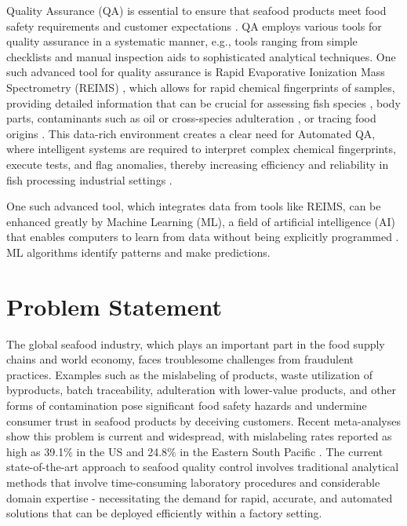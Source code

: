 Quality Assurance (QA) is essential to ensure that seafood products meet food safety requirements and customer expectations \citep{Montgomery2019}. QA employs various tools for quality assurance in a systematic manner, e.g., tools ranging from simple checklists and manual inspection aids to sophisticated analytical techniques. One such advanced tool for quality assurance is Rapid Evaporative Ionization Mass Spectrometry (REIMS) \citep{Schaefer2009, Cafarella2024}, which allows for rapid chemical fingerprints of samples, providing detailed information that can be crucial for assessing fish species \citep{Black2017, Shen2020, Shen2022}, body parts, contaminants such as oil or cross-species adulteration \citep{Premanandh2013}, or tracing food origins \citep{Lu2024, Gao2025, Gkarane2025}. This data-rich environment creates a clear need for Automated QA, where intelligent systems are required to interpret complex chemical fingerprints, execute tests, and flag anomalies, thereby increasing efficiency and reliability in fish processing industrial settings \citep{Xing2016}.

One such advanced tool, which integrates data from tools like REIMS, can be enhanced greatly by Machine Learning (ML), a field of artificial intelligence (AI) that enables computers to learn from data without being explicitly programmed \citep{Russell2016}. ML algorithms identify patterns and make predictions.

\section{Problem Statement}


The global seafood industry, which plays an important part in the food supply chains and world economy, faces troublesome challenges from fraudulent practices. Examples such as the mislabeling of products, waste utilization of byproducts, batch traceability, adulteration with lower-value products, and other forms of contamination pose significant food safety hazards and undermine consumer trust in seafood products by deceiving customers. Recent meta-analyses show this problem is current and widespread, with mislabeling rates reported as high as 39.1\% in the US \citep{Ahles2025} and 24.8\% in the Eastern South Pacific \citep{Marin2025}. The current state-of-the-art approach to seafood quality control involves traditional analytical methods that involve time-consuming laboratory procedures and considerable domain expertise - necessitating the demand for rapid, accurate, and automated solutions that can be deployed efficiently within a factory setting.

